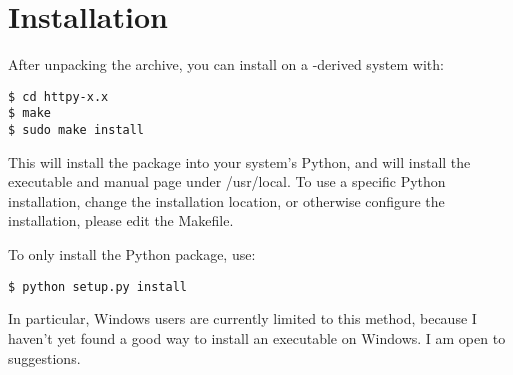 \chapter{Installation}

After unpacking the archive, you can install  on a \UNIX-derived
system with:

\begin{verbatim}
$ cd httpy-x.x
$ make
$ sudo make install
\end{verbatim}

This will install the  package into your system's Python, and will
install the executable and manual page under /usr/local. To use a specific
Python installation, change the installation location, or otherwise configure
the installation, please edit the Makefile.

To only install the Python package, use:

\begin{verbatim}
$ python setup.py install
\end{verbatim}

In particular, Windows users are currently limited to this method, because I
haven't yet found a good way to install an executable on Windows. I am open to
suggestions.
